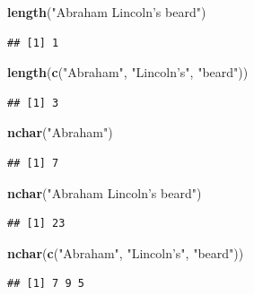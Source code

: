 \documentclass[
]{book}
\newenvironment{Shaded}{\begin{snugshade}}{\end{snugshade}}
\newcommand{\KeywordTok}[1]{\textcolor[rgb]{0.13,0.29,0.53}{\textbf{#1}}}
\newcommand{\NormalTok}[1]{#1}
\newcommand{\StringTok}[1]{\textcolor[rgb]{0.31,0.60,0.02}{#1}}
\begin{document}
\begin{Shaded}
\begin{Highlighting}[]
\KeywordTok{length}\NormalTok{(}\StringTok{"Abraham Lincoln's beard"}\NormalTok{)}
\end{Highlighting}
\end{Shaded}

\begin{verbatim}
## [1] 1
\end{verbatim}

\begin{Shaded}
\begin{Highlighting}[]
\KeywordTok{length}\NormalTok{(}\KeywordTok{c}\NormalTok{(}\StringTok{"Abraham"}\NormalTok{, }\StringTok{"Lincoln's"}\NormalTok{, }\StringTok{"beard"}\NormalTok{))}
\end{Highlighting}
\end{Shaded}

\begin{verbatim}
## [1] 3
\end{verbatim}

\begin{Shaded}
\begin{Highlighting}[]
\KeywordTok{nchar}\NormalTok{(}\StringTok{"Abraham"}\NormalTok{)}
\end{Highlighting}
\end{Shaded}

\begin{verbatim}
## [1] 7
\end{verbatim}

\begin{Shaded}
\begin{Highlighting}[]
\KeywordTok{nchar}\NormalTok{(}\StringTok{"Abraham Lincoln's beard"}\NormalTok{)}
\end{Highlighting}
\end{Shaded}

\begin{verbatim}
## [1] 23
\end{verbatim}

\begin{Shaded}
\begin{Highlighting}[]
\KeywordTok{nchar}\NormalTok{(}\KeywordTok{c}\NormalTok{(}\StringTok{"Abraham"}\NormalTok{, }\StringTok{"Lincoln's"}\NormalTok{, }\StringTok{"beard"}\NormalTok{))}
\end{Highlighting}
\end{Shaded}

\begin{verbatim}
## [1] 7 9 5
\end{verbatim}
\end{document}
